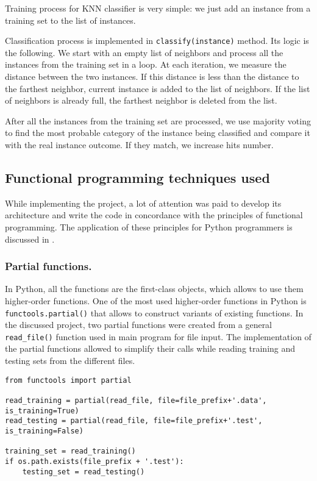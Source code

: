 \documentclass{llncs}
\begin{document}
Training process for KNN classifier is very simple: we just add an instance from a training set to the list of instances.

Classification process is implemented in \lstinline{classify(instance)} method. Its logic is the following. We start with an empty list of neighbors and process all the instances from the training set in a loop. At each iteration, we measure the distance between the two instances. If this distance is less than the distance to the farthest neighbor, current instance is added to the list of neighbors. If the list of neighbors is already full, the farthest neighbor is deleted from the list. 

After all the instances from the training set are processed, we use majority voting to find the most probable category of the instance being classified and compare it with the real instance outcome. If they match, we increase hits number.

\subsection{Functional programming techniques used}

While implementing the project, a lot of attention was paid to develop its architecture and write the code in concordance with the principles of functional programming. The application of these principles for Python programmers is discussed in \cite{Kuchling}\cite{Mertz}.

\subsubsection{Partial functions.}

In Python, all the functions are the first-class objects, which allows to use them higher-order functions. One of the most used higher-order functions in Python is \lstinline{functools.partial()} that allows to construct variants of existing functions. In the discussed project, two partial functions were created from a general \lstinline{read_file()} function used in main program for file input. The implementation of the partial functions allowed to simplify their calls while reading training and testing sets from the different files. 

\begin{lstlisting}[caption = Application of partial functions.]
from functools import partial

read_training = partial(read_file, file=file_prefix+'.data', is_training=True)
read_testing = partial(read_file, file=file_prefix+'.test', is_training=False)

training_set = read_training()
if os.path.exists(file_prefix + '.test'):
	testing_set = read_testing()
\end{lstlisting}
\end{document}
